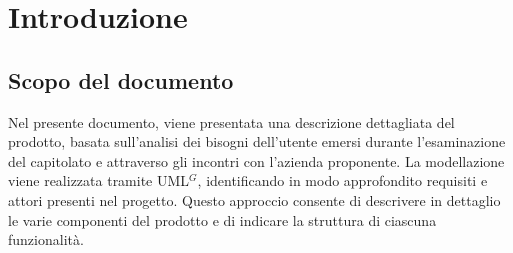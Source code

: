 \section{Introduzione}

\subsection{Scopo del documento}
Nel presente documento, viene presentata una descrizione dettagliata del prodotto, basata sull'analisi dei bisogni dell'utente 
emersi durante l'esaminazione del capitolato e attraverso gli incontri con l'azienda proponente. 
La modellazione viene realizzata tramite UML$^G$, identificando in modo approfondito requisiti e attori presenti nel progetto. 
Questo approccio consente di descrivere in dettaglio le varie componenti del prodotto e di indicare la struttura di ciascuna funzionalità.\\

